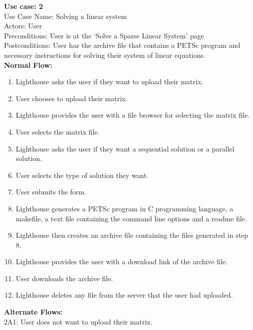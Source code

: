 \noindent \textbf{Use case: 2}\\
Use Case Name: Solving a linear system\\
Actors: User\\
Preconditions: User is at the ‘Solve a Sparse Linear System’ page\\
Postconditions: User has the archive file that contains a PETSc program and necessary instructions for solving their system of linear equations.\\
\textbf{Normal Flow:}
\begin{enumerate}
  \item Lighthouse asks the user if they want to upload their matrix. 
  \item User chooses to upload their matrix. 
  \item Lighthouse provides the user with a file browser for selecting the matrix file. 
  \item User selects the matrix file. 
  \item Lighthouse asks the user if they want a sequential solution or a parallel solution. 
  \item User selects the type of solution they want. 
  \item User submits the form. 
  \item Lighthouse generates a PETSc program in C programming language, a makefile, a text file containing the command line options and a readme file. 
  \item Lighthouse then creates an archive file containing the files generated in step 8. 
  \item Lighthouse provides the user with a download link of the archive file.
  \item User downloads the archive file.
  \item Lighthouse deletes any file from the server that the user had uploaded.
\end{enumerate}
\textbf{Alternate Flows:} \\ 
2A1: User does not want to upload their matrix. 
